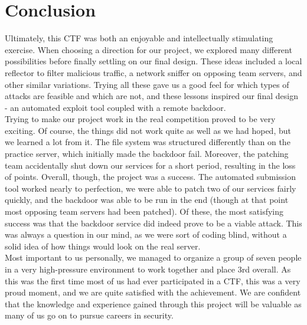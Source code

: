 \documentclass[12pt]{report}
\begin{document}
\section*{Conclusion}	
Ultimately, this CTF was both an enjoyable and intellectually stimulating exercise. When choosing a direction for our project, we explored many different possibilities before finally settling on our final design. These ideas included a local reflector to filter malicious traffic, a network sniffer on opposing team servers, and other similar variations. Trying all these gave us a good feel for which types of attacks are feasible and which are not, and these lessons inspired our final design - an automated exploit tool coupled with a remote backdoor.\\
Trying to make our project work in the real competition proved to be very exciting. Of course, the things did not work quite as well as we had hoped, but we learned a lot from it. The file system was structured differently than on the practice server, which initially made the backdoor fail. Moreover, the patching team accidentally shut down our services for a short period, resulting in the loss of points. Overall, though, the project was a success. The automated submission tool worked nearly to perfection, we were able to patch two of our services fairly quickly, and the backdoor was able to be run in the end (though at that point most opposing team servers had been patched). Of these, the most satisfying success was that the backdoor service did indeed prove to be a viable attack. This was always a question in our mind, as we were sort of coding blind, without a solid idea of how things would look on the real server.\\

\noindent Most important to us personally, we managed to organize a group of seven people in a very high-pressure environment to work together and place 3rd overall. As this was the first time most of us had ever participated in a CTF, this was a very proud moment, and we are quite satisfied with the achievement. We are confident that the knowledge and experience gained through this project will be valuable as many of us go on to pursue careers in security.
\end{document}
